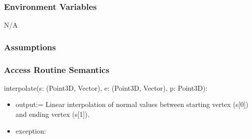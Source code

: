 \documentclass[12pt, titlepage]{article}
\begin{document}
\subsubsection{Environment Variables}
N/A

\subsubsection{Assumptions}

\subsubsection{Access Routine Semantics}
\noindent interpolate(s: (Point3D, Vector), e: (Point3D, Vector), p: Point3D):
\begin{itemize}
	\item output:= Linear interpolation of normal values between starting 
	vertex (s[0]) and ending vertex (s[1]).\\
	\item exception: \\
\end{itemize}
\end{document}
